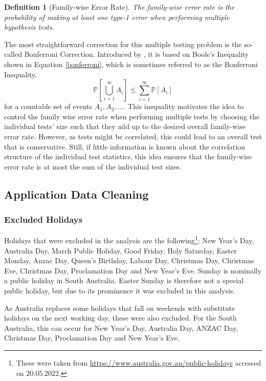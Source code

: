 \documentclass[12pt, a4paper]{article}
\theoremstyle{MAstyle} \newtheorem{assumption}{Assumption}[section]
\theoremstyle{MAstyle} \newtheorem{definition}{Definition}[section]
\theoremstyle{MAstyle} \newtheorem{theorem}{Theorem}[section]
\begin{document}
			\begin{definition}[Family-wise Error Rate]
				The family-wise error rate is the probability of making at least one type-1 error when performing multiple hypothesis tests.
			\end{definition}
		
			The most straightforward correction for this multiple testing problem is the so-called Bonferroni Correction. Introduced by \cite{dunn_multiple_1961}, it is based on Boole's Inequality shown in Equation \ref{bonferroni}, which is sometimes referred to as the Bonferroni Inequality.
			\begin{equation}\label{bonferroni}
				\mathbb{P}\left[\bigcup_{i = 1}^{\infty} A_i\right] \leq \sum_{i = 1}^{\infty} \mathbb{P}\left[A_i\right]
			\end{equation}
			for a countable set of events $A_1, A_2, \dots$.
			This inequality motivates the idea to control the family wise error rate when performing multiple tests by choosing the individual tests' size such that they add up to the desired overall family-wise error rate. However, as tests might be correlated, this could lead to an overall test that is conservative. Still, if little information is known about the correlation structure of the individual test statistics, this idea ensures that the family-wise error rate is at most the sum of the individual test sizes.		

			
		\subsection{Application Data Cleaning}\label{Application_Appendix}
			\subsubsection{Excluded Holidays}
			Holidays that were excluded in the analysis are the following\footnote{These were taken from \url{https://www.australia.gov.au/public-holidays} accessed on 20.05.2022.}: New Year's Day, Australia Day, March Public Holiday, Good Friday, Holy Saturday, Easter Monday, Anzac Day, Queen's Birthday, Labour Day, Christmas Day, Christmas Eve, Christmas Day, Proclamation Day and New Year's Eve. Sunday is nominally a public holiday in South Australia. Easter Sunday is therefore not a special public holiday, but due to its prominence it was excluded in this analysis.
			
			As Australia replaces some holidays that fall on weekends with substitute holidays on the next working day, these were also excluded. For the South Australia, this can occur for New Year's Day, Australia Day, ANZAC Day, Christmas Day, Proclamation Day and New Year's Eve.
		
\end{document}
